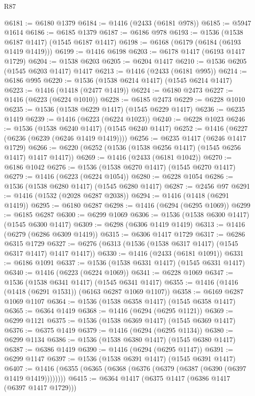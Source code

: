 \begin{lexlean}{R87}
\begin{coremodule}
{{@6181 := @6180 @1379
@6184 := @1416 (@2433 (@6181 @978))
@6185 := @5947 @1614
@6186 := @6185 @1379
@6187 := @6186 @978
@6193 := @1536 (@1538 @6187 @1417) (@1545 @6187 @1417)
@6198 := @6168 (@6179 (@6184 (@6193 @1419 @1419)))
@6199 := @1416 @6198
@6203 := @6178 @1417 (@6193 @1417 @1729)
@6204 := @1538 @6203
@6205 := @6204 @1417
@6210 := @1536 @6205 (@1545 @6203 @1417) @1417
@6213 := @1416 (@2433 (@6181 @995))
@6214 := @6186 @995
@6220 := @1536 (@1538 @6214 @1417) (@1545 @6214 @1417)
@6223 := @1416 (@1418 (@2477 @1419))
@6224 := @6180 @2473
@6227 := @1416 (@6223 (@6224 @1010))
@6228 := @6185 @2473
@6229 := @6228 @1010
@6235 := @1536 (@1538 @6229 @1417) (@1545 @6229 @1417)
@6236 := @6235 @1419
@6239 := @1416 (@6223 (@6224 @1023))
@6240 := @6228 @1023
@6246 := @1536 (@1538 @6240 @1417) (@1545 @6240 @1417)
@6252 := @1416 (@6227 (@6236 (@6239 (@6246 @1419 @1419))))
@6256 := @6235 @1417 (@6246 @1417 @1729)
@6266 := @6220 (@6252 (@1536 (@1538 @6256 @1417) (@1545 @6256 @1417) @1417 @1417))
@6269 := @1416 (@2433 (@6181 @1042))
@6270 := @6186 @1042
@6276 := @1536 (@1538 @6270 @1417) (@1545 @6270 @1417)
@6279 := @1416 (@6223 (@6224 @1054))
@6280 := @6228 @1054
@6286 := @1536 (@1538 @6280 @1417) (@1545 @6280 @1417)
@6287 := @2456 @97
@6291 := @1416 (@1532 (@2028 @6287 @2038))
@6294 := @1416 (@1418 (@6291 @1419))
@6295 := @6180 @6287
@6298 := @1416 (@6294 (@6295 @1069))
@6299 := @6185 @6287
@6300 := @6299 @1069
@6306 := @1536 (@1538 @6300 @1417) (@1545 @6300 @1417)
@6309 := @6298 (@6306 @1419 @1419)
@6313 := @1416 (@6279 (@6286 @6309 @1419))
@6315 := @6306 @1417 @1729
@6317 := @6286 @6315 @1729
@6327 := @6276 (@6313 (@1536 (@1538 @6317 @1417) (@1545 @6317 @1417) @1417 @1417))
@6330 := @1416 (@2433 (@6181 @1091))
@6331 := @6186 @1091
@6337 := @1536 (@1538 @6331 @1417) (@1545 @6331 @1417)
@6340 := @1416 (@6223 (@6224 @1069))
@6341 := @6228 @1069
@6347 := @1536 (@1538 @6341 @1417) (@1545 @6341 @1417)
@6355 := @1416 (@1416 (@1418 (@6291 @1531)) (@6163 @6287 @1069 @1107))
@6358 := @6169 @6287 @1069 @1107
@6364 := @1536 (@1538 @6358 @1417) (@1545 @6358 @1417)
@6365 := @6364 @1419
@6368 := @1416 (@6294 (@6295 @1121))
@6369 := @6299 @1121
@6375 := @1536 (@1538 @6369 @1417) (@1545 @6369 @1417)
@6376 := @6375 @1419
@6379 := @1416 (@6294 (@6295 @1134))
@6380 := @6299 @1134
@6386 := @1536 (@1538 @6380 @1417) (@1545 @6380 @1417)
@6387 := @6386 @1419
@6390 := @1416 (@6294 (@6295 @1147))
@6391 := @6299 @1147
@6397 := @1536 (@1538 @6391 @1417) (@1545 @6391 @1417)
@6407 := @1416 (@6355 (@6365 (@6368 (@6376 (@6379 (@6387 (@6390 (@6397 @1419 @1419))))))))
@6415 := @6364 @1417 (@6375 @1417 (@6386 @1417 (@6397 @1417 @1729)))
}}
\end{coremodule}
\end{lexlean}
